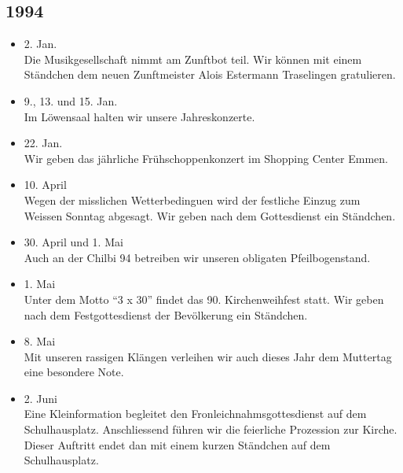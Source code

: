 \subsection{1994}

\begin{history}


    \begin{itemize}

        \item 2. Jan.\\
              Die Musikgesellschaft nimmt am Zunftbot teil. Wir können mit einem
              Ständchen dem neuen Zunftmeister Alois Estermann Traselingen
              gratulieren.

        \item 9., 13. und 15. Jan.\\
              Im Löwensaal halten wir unsere Jahreskonzerte.

        \item 22. Jan.\\
              Wir geben das jährliche Frühschoppenkonzert im Shopping Center Emmen.

        \item 10. April\\
              Wegen der misslichen Wetterbedinguen wird der festliche Einzug zum
              Weissen Sonntag abgesagt. Wir geben nach dem Gottesdienst ein Ständchen.

        \item 30. April und 1. Mai\\
              Auch an der Chilbi 94 betreiben wir unseren obligaten Pfeilbogenstand.

        \item 1. Mai\\
              Unter dem Motto \enquote{3 x 30} findet das 90. Kirchenweihfest statt.
              Wir geben nach dem Festgottesdienst der Bevölkerung ein Ständchen.

        \item 8. Mai\\
              Mit unseren rassigen Klängen verleihen wir auch dieses Jahr dem
              Muttertag eine besondere Note.

        \item 2. Juni\\
              Eine Kleinformation begleitet den Fronleichnahmsgottesdienst auf dem
              Schulhausplatz. Anschliessend führen wir die feierliche Prozession zur
              Kirche. Dieser Auftritt endet dan mit einem kurzen Ständchen auf dem
              Schulhausplatz.


\end{itemize}
\end{history}

